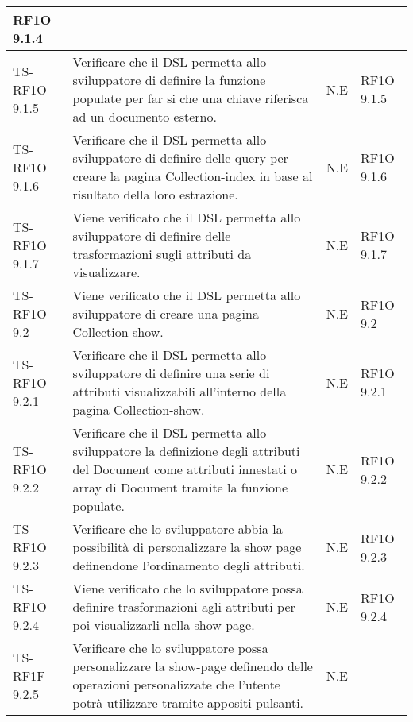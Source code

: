 \begin{center}
\begin{longtable}{| p{3cm} | p{6cm} | p{1.5cm} | p{2cm} | }
            RF1O 9.1.4 \newline  \\ \hline 
        TS-RF1O 9.1.5 & 
        Verificare che il DSL permetta allo sviluppatore di definire la funzione populate per far si che una chiave riferisca ad un documento esterno. & N.E &       
            RF1O 9.1.5 \newline  \\ \hline 
        TS-RF1O 9.1.6 & 
        Verificare che il DSL permetta allo sviluppatore di definire delle query per creare la pagina Collection-index in base al risultato della loro estrazione. & N.E &       
            RF1O 9.1.6 \newline  \\ \hline 
        TS-RF1O 9.1.7 & 
        Viene verificato che il DSL permetta allo sviluppatore di definire delle trasformazioni sugli attributi da visualizzare. & N.E &       
            RF1O 9.1.7 \newline  \\ \hline 
        TS-RF1O 9.2 & 
        Viene verificato che il DSL permetta allo sviluppatore di creare una pagina Collection-show. & N.E &       
            RF1O 9.2 \newline  \\ \hline 
        TS-RF1O 9.2.1 & 
        Verificare che il DSL permetta allo sviluppatore di definire una serie di attributi visualizzabili all’interno della pagina Collection-show. & N.E &       
            RF1O 9.2.1 \newline  \\ \hline 
        TS-RF1O 9.2.2 & 
        Verificare che il DSL permetta allo sviluppatore la definizione degli attributi del Document come attributi innestati o array di Document tramite la funzione populate. & N.E &       
            RF1O 9.2.2 \newline  \\ \hline 
        TS-RF1O 9.2.3 & 
        Verificare che lo sviluppatore abbia la possibilità di personalizzare la show page definendone l’ordinamento degli attributi. & N.E &       
            RF1O 9.2.3 \newline  \\ \hline 
        TS-RF1O 9.2.4 & 
        Viene verificato che lo sviluppatore possa definire trasformazioni agli attributi per poi visualizzarli nella show-page. & N.E &       
            RF1O 9.2.4 \newline  \\ \hline 
        TS-RF1F 9.2.5 & 
        Verificare che lo sviluppatore possa personalizzare la show-page definendo delle operazioni personalizzate che l’utente potrà utilizzare tramite appositi pulsanti. & N.E &       

\end{longtable}
\end{center}
